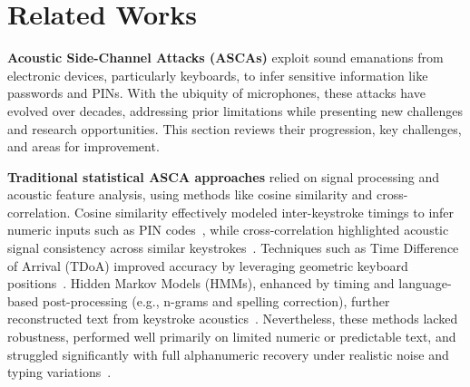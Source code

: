 
\section{Related Works}
\label{sec:related}

\noindent
\textbf{Acoustic Side-Channel Attacks (ASCAs)} exploit sound emanations from electronic devices, particularly keyboards, to infer sensitive information like passwords and PINs. With the ubiquity of microphones, these attacks have evolved over decades, addressing prior limitations while presenting new challenges and research opportunities. This section reviews their progression, key challenges, and areas for improvement.

\textbf{Traditional statistical ASCA approaches} relied on signal processing and acoustic feature analysis, using methods like cosine similarity and cross-correlation. Cosine similarity effectively modeled inter-keystroke timings to infer numeric inputs such as PIN codes~\cite{liu2019human}, while cross-correlation highlighted acoustic signal consistency across similar keystrokes~\cite{panda2020behavioral}. Techniques such as Time Difference of Arrival (TDoA) improved accuracy by leveraging geometric keyboard positions~\cite{de2019differential, zhu2014context}. Hidden Markov Models (HMMs), enhanced by timing and language-based post-processing (e.g., n-grams and spelling correction), further reconstructed text from keystroke acoustics~\cite{foo2010timing, zhuang2009keyboard}. Nevertheless, these methods lacked robustness, performed well primarily on limited numeric or predictable text, and struggled significantly with full alphanumeric recovery under realistic noise and typing variations~\cite{taheritajar2024survey}.

